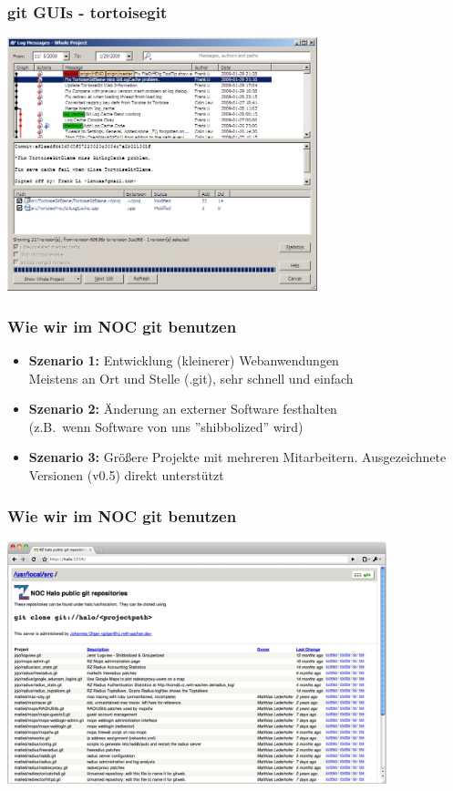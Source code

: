 \begin{frame}
  \frametitle{git GUIs - tortoisegit}
  \vspace{-0.3cm}
  \begin{center}
    \includegraphics[width=9cm]{img/tortoisegit2.png}
  \end{center}
\end{frame}

\begin{frame}
  \frametitle{Wie wir im NOC git benutzen}
  \begin{itemize}
    \item {\bf Szenario 1:} Entwicklung (kleinerer) Webanwendungen \\ Meistens an Ort und Stelle (.git), sehr schnell und einfach
    \item {\bf Szenario 2:} Änderung an externer Software festhalten \\ (z.B.\ wenn Software von uns ''shibbolized'' wird)
    \item {\bf Szenario 3:} Größere Projekte mit mehreren Mitarbeitern. Ausgezeichnete Versionen (v0.5) direkt unterstützt
  \end{itemize}
\end{frame}

\begin{frame}
  \frametitle{Wie wir im NOC git benutzen}
  \vspace{-0.8cm}
  \begin{center}
    \includegraphics[width=11cm]{img/git_halo.png}
  \end{center}
\end{frame}

